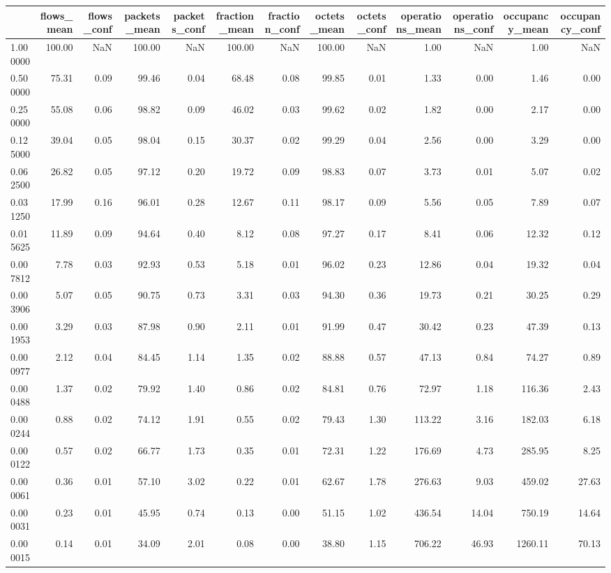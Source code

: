 \begin{tabular}{lrrrrrrrrrrrr}
\toprule
 & flows_mean & flows_conf & packets_mean & packets_conf & fraction_mean & fraction_conf & octets_mean & octets_conf & operations_mean & operations_conf & occupancy_mean & occupancy_conf \\
\midrule
1.000000 & 100.00 & NaN & 100.00 & NaN & 100.00 & NaN & 100.00 & NaN & 1.00 & NaN & 1.00 & NaN \\
0.500000 & 75.31 & 0.09 & 99.46 & 0.04 & 68.48 & 0.08 & 99.85 & 0.01 & 1.33 & 0.00 & 1.46 & 0.00 \\
0.250000 & 55.08 & 0.06 & 98.82 & 0.09 & 46.02 & 0.03 & 99.62 & 0.02 & 1.82 & 0.00 & 2.17 & 0.00 \\
0.125000 & 39.04 & 0.05 & 98.04 & 0.15 & 30.37 & 0.02 & 99.29 & 0.04 & 2.56 & 0.00 & 3.29 & 0.00 \\
0.062500 & 26.82 & 0.05 & 97.12 & 0.20 & 19.72 & 0.09 & 98.83 & 0.07 & 3.73 & 0.01 & 5.07 & 0.02 \\
0.031250 & 17.99 & 0.16 & 96.01 & 0.28 & 12.67 & 0.11 & 98.17 & 0.09 & 5.56 & 0.05 & 7.89 & 0.07 \\
0.015625 & 11.89 & 0.09 & 94.64 & 0.40 & 8.12 & 0.08 & 97.27 & 0.17 & 8.41 & 0.06 & 12.32 & 0.12 \\
0.007812 & 7.78 & 0.03 & 92.93 & 0.53 & 5.18 & 0.01 & 96.02 & 0.23 & 12.86 & 0.04 & 19.32 & 0.04 \\
0.003906 & 5.07 & 0.05 & 90.75 & 0.73 & 3.31 & 0.03 & 94.30 & 0.36 & 19.73 & 0.21 & 30.25 & 0.29 \\
0.001953 & 3.29 & 0.03 & 87.98 & 0.90 & 2.11 & 0.01 & 91.99 & 0.47 & 30.42 & 0.23 & 47.39 & 0.13 \\
0.000977 & 2.12 & 0.04 & 84.45 & 1.14 & 1.35 & 0.02 & 88.88 & 0.57 & 47.13 & 0.84 & 74.27 & 0.89 \\
0.000488 & 1.37 & 0.02 & 79.92 & 1.40 & 0.86 & 0.02 & 84.81 & 0.76 & 72.97 & 1.18 & 116.36 & 2.43 \\
0.000244 & 0.88 & 0.02 & 74.12 & 1.91 & 0.55 & 0.02 & 79.43 & 1.30 & 113.22 & 3.16 & 182.03 & 6.18 \\
0.000122 & 0.57 & 0.02 & 66.77 & 1.73 & 0.35 & 0.01 & 72.31 & 1.22 & 176.69 & 4.73 & 285.95 & 8.25 \\
0.000061 & 0.36 & 0.01 & 57.10 & 3.02 & 0.22 & 0.01 & 62.67 & 1.78 & 276.63 & 9.03 & 459.02 & 27.63 \\
0.000031 & 0.23 & 0.01 & 45.95 & 0.74 & 0.13 & 0.00 & 51.15 & 1.02 & 436.54 & 14.04 & 750.19 & 14.64 \\
0.000015 & 0.14 & 0.01 & 34.09 & 2.01 & 0.08 & 0.00 & 38.80 & 1.15 & 706.22 & 46.93 & 1260.11 & 70.13 \\

\end{tabular}
